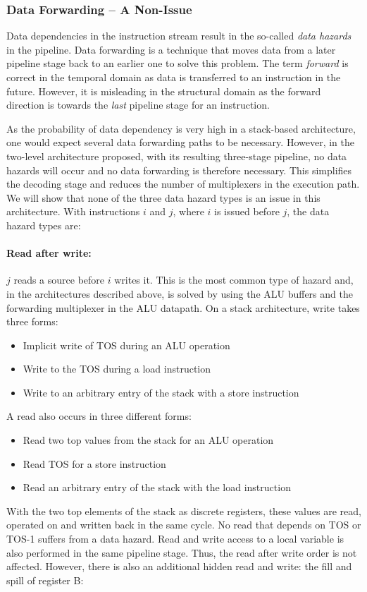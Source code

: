 \subsubsection{Data Forwarding -- A Non-Issue}

Data dependencies in the instruction stream result in the so-called
\emph{data hazards} \cite{Hennessy02} in the pipeline. Data
forwarding is a technique that moves data from a later pipeline
stage back to an earlier one to solve this problem. The term
\emph{forward} is correct in the temporal domain as data is
transferred to an instruction in the future. However, it is
misleading in the structural domain as the forward direction is
towards the \emph{last} pipeline stage for an instruction.

As the probability of data dependency is very high in a stack-based
architecture, one would expect several data forwarding paths to be
necessary. However, in the two-level architecture proposed, with its
resulting three-stage pipeline, no data hazards will occur and no
data forwarding is therefore necessary. This simplifies the decoding
stage and reduces the number of multiplexers in the execution path.
We will show that none of the three data hazard types
\cite{Hennessy02} is an issue in this architecture. With instructions
$i$ and $j$, where $i$ is issued before $j$, the data hazard types
are:

\paragraph{Read after write:} $j$ reads a source before $i$ writes it. This
is the most common type of hazard and, in the architectures
described above, is solved by using the ALU buffers and the
forwarding multiplexer in the ALU datapath. On a stack architecture,
write takes three forms:
%
\begin{itemize}
    \item Implicit write of TOS during an ALU operation
    \item Write to the TOS during a load instruction
    \item Write to an arbitrary entry of the stack with a store instruction
\end{itemize}
%
A read also occurs in three different forms:
\begin{itemize}
    \item Read two top values from the stack for an ALU operation
    \item Read TOS for a store instruction
    \item Read an arbitrary entry of the stack with the load instruction
\end{itemize}
%
With the two top elements of the stack as discrete registers, these
values are read, operated on and written back in the same cycle. No
read that depends on TOS or TOS-1 suffers from a data hazard. Read
and write access to a local variable is also performed in the same
pipeline stage. Thus, the read after write order is not affected.
However, there is also an additional hidden read and write: the fill
and spill of register B:



